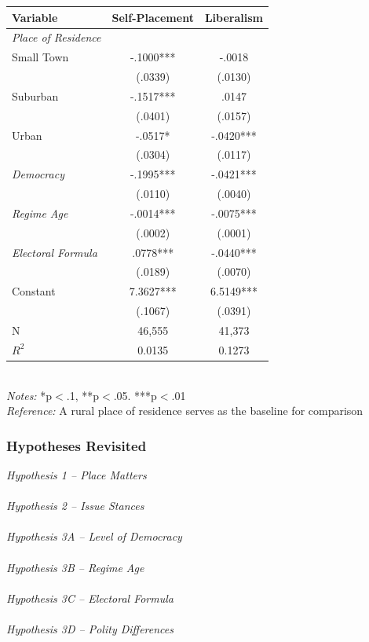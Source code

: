\documentclass[20pt]{beamer}
\newcommand\e{\emph}
\newcommand\tb{\textbf}
\begin{document}
\begin{frame}
\tiny
\begin{table}[h!]
	\centering
	\begin{tabulary}{\linewidth}{l c c}
		\hline
		\tb{Variable}&\tb{Self-Placement}&\tb{Liberalism} \\
		\hline
		\e{Place of Residence} & & \\
		Small Town &-.1000***&-.0018 \\
		&(.0339)&(.0130) \\
		Suburban& -.1517***& .0147 \\
		&(.0401)& (.0157) \\
		Urban&-.0517* & -.0420*** \\
		&(.0304) & (.0117) \\
		\e{Democracy}& -.1995*** & -.0421***\\
		&(.0110) & (.0040)\\
		\e{Regime Age} & -.0014*** &  -.0075***\\
		&(.0002) & (.0001)\\
		\e{Electoral Formula}&.0778*** & -.0440***\\
		&(.0189) & (.0070) \\
		\hline
		Constant& 7.3627*** & 6.5149*** \\
		&(.1067) & (.0391)\\
		N&46,555 & 41,373 \\
		$R^2$&0.0135& 0.1273 \\
		\hline
	\end{tabulary}
	\\
	\e{Notes:} *p$<$.1, **p$<$.05. ***p$<$.01 \\
	\e{Reference:} A rural place of residence serves as the baseline for comparison
\end{table}
\end{frame}

\begin{frame}
\footnotesize
\frametitle{Hypotheses Revisited}

\e {Hypothesis 1 -- Place Matters} \\
~~\\
\e{Hypothesis 2 -- Issue Stances} \\
~~\\
\e{Hypothesis 3A -- Level of Democracy} \\
~~\\
\e{Hypothesis 3B -- Regime Age} \\
~~\\
\e{Hypothesis 3C -- Electoral Formula}\\
~~\\
\e{Hypothesis 3D -- Polity Differences} 

\end{frame}
\end{document}

